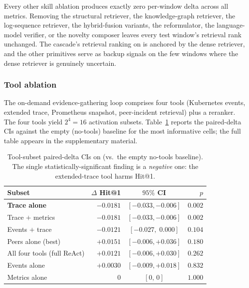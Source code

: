 Every other skill ablation produces exactly zero per-window delta across all metrics. Removing the structural retriever, the knowledge-graph retriever, the log-sequence retriever, the hybrid-fusion variants, the reformulator, the language-model verifier, or the novelty composer leaves every test window's retrieval rank unchanged. The cascade's retrieval ranking on \dsob{} is anchored by the dense retriever, and the other primitives serve as backup signals on the few windows where the dense retriever is genuinely uncertain.

\subsubsection{Tool ablation}

The on-demand evidence-gathering loop comprises four tools (Kubernetes events, extended trace, Prometheus snapshot, peer-incident retrieval) plus a reranker. The four tools yield $2^{4} = 16$ activation subsets. Table~\ref{tab:tool-paired} reports the paired-delta CIs against the empty (no-tools) baseline for the most informative cells; the full table appears in the supplementary material.

\begin{table}[ht]
  \centering
  \caption{Tool-subset paired-delta CIs on \dsob{} (vs.\ the empty no-tools baseline). The single statistically-significant finding is a \emph{negative} one: the extended-trace tool harms Hit@1.}
  \label{tab:tool-paired}
  \footnotesize
  \setlength{\tabcolsep}{3pt}
  \begin{tabular}{@{}l r c r@{}}
    \toprule
    Subset & $\Delta$ Hit@1 & $95\%$ CI & $p$ \\
    \midrule
    \textbf{Trace alone}            & $\mathbf{-0.0181}$ & $\mathbf{[-0.033, -0.006]}$ & $\mathbf{0.002}$ \\
    Trace $+$ metrics               & $-0.0181$ & $[-0.033, -0.006]$ & $0.002$ \\
    Events $+$ trace                & $-0.0121$ & $[-0.027,\;0.000]$ & $0.104$ \\
    Peers alone (best)              & $+0.0151$ & $[-0.006, +0.036]$ & $0.180$ \\
    All four tools (full ReAct)     & $+0.0121$ & $[-0.006, +0.030]$ & $0.262$ \\
    Events alone                    & $+0.0030$ & $[-0.009, +0.018]$ & $0.832$ \\
    Metrics alone                   & $\;0$     & $[0,\,0]$          & $1.000$ \\
    \bottomrule
  \end{tabular}
\end{table}

